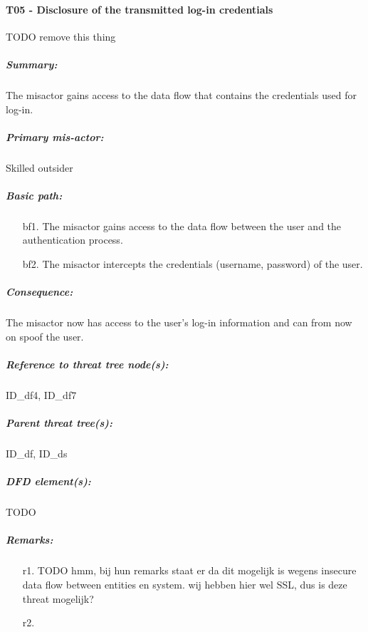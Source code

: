 

\paragraph{T05 - Disclosure of the transmitted log-in credentials}
\label{par:t05}
TODO remove this thing
    \subparagraph{Summary:} The misactor gains access to the data flow that contains the credentials used for log-in.
    \subparagraph{Primary mis-actor:} Skilled outsider
    \subparagraph{Basic path:}
    \begin{enumerate}
        \item[bf1.] The misactor gains access to the data flow between the user and the authentication process.
        \item[bf2.] The misactor intercepts the credentials (username, password) of the user.
    \end{enumerate}
    \subparagraph{Consequence:} The misactor now has access to the user's log-in information and can from
now on spoof the user.


    \subparagraph{Reference to threat tree node(s):} ID\_df4, ID\_df7
    \subparagraph{Parent threat tree(s):} ID\_df, ID\_ds
    \subparagraph{DFD element(s):} TODO
    \subparagraph{Remarks:}
    \begin{enumerate}
        \item[r1.] TODO hmm, bij hun remarks staat er da dit mogelijk is wegens insecure data flow between entities en system.
						wij hebben hier wel SSL, dus is deze threat mogelijk?
        \item[r2.]
    \end{enumerate}



